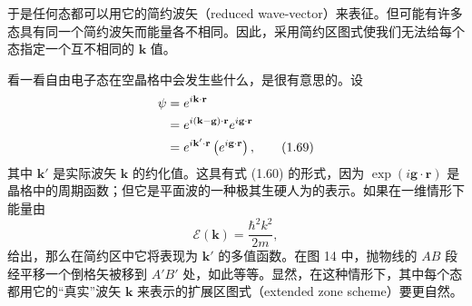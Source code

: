 于是任何态都可以用它的简约波矢（reduced wave-vector）来表征。但可能有许多态具有同一个简约波矢而能量各不相同。因此，采用简约区图式使我们无法给每个态指定一个互不相同的 $\mathbf{k}$ 值。


看一看自由电子态在空晶格中会发生些什么，是很有意思的。设
\begin{align*}
\psi&=e^{i\mathbf{k}\cdot\mathbf{r}}\notag\\
&=e^{i(\mathbf{k}-\mathbf{g})\cdot\mathbf{r}}e^{i\mathbf{g}\cdot\mathbf{r}}\notag\\
&=e^{i\mathbf{k}'\cdot\mathbf{r}}\left(e^{i\mathbf{g}\cdot\mathbf{r}}\right),
\tag{1.69}
\end{align*}
其中 $\mathbf{k}'$ 是实际波矢 $\mathbf{k}$ 的约化值。这具有式 (1.60) 的形式，因为 $\exp(i\mathbf{g}\cdot\mathbf{r})$ 是晶格中的周期函数；但它是平面波的一种极其生硬人为的表示。如果在一维情形下能量由
\begin{equation*}
\mathcal{E}(\mathbf{k})=\frac{\hbar^{2}k^{2}}{2m},
\tag{1.70}
\end{equation*}
给出，那么在简约区中它将表现为 $\mathbf{k}'$ 的多值函数。在图 14 中，抛物线的 $AB$ 段经平移一个倒格矢被移到 $A'B'$ 处，如此等等。显然，在这种情形下，其中每个态都用它的“真实”波矢 $\mathbf{k}$ 来表示的扩展区图式（extended zone scheme）要更自然。
